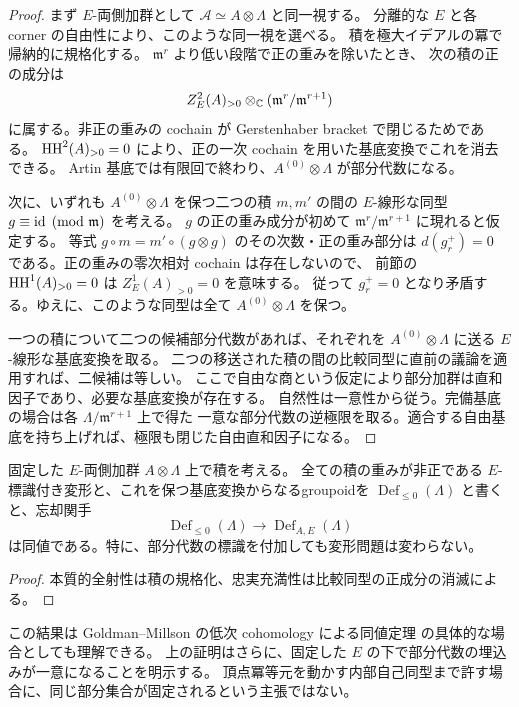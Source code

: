 \begin{proof}
まず $E$-両側加群として $\mathcal A\simeq A\otimes\Lambda$ と同一視する。
分離的な $E$ と各 corner の自由性により、このような同一視を選べる。
積を極大イデアルの冪で帰納的に規格化する。
$\mathfrak m^r$ より低い段階で正の重みを除いたとき、
次の積の正の成分は
\[
 Z^2_E(A)_{>0}\otimes_\mathbb C(\mathfrak m^r/\mathfrak m^{r+1})
\]
に属する。非正の重みの cochain が Gerstenhaber bracket で閉じるためである。
$\operatorname{HH}^2(A)_{>0}=0$ により、正の一次 cochain を用いた基底変換でこれを消去できる。
Artin 基底では有限回で終わり、$A^{(0)}\otimes\Lambda$ が部分代数になる。

次に、いずれも $A^{(0)}\otimes\Lambda$ を保つ二つの積 $m,m'$ の間の
$E$-線形な同型 $g\equiv\operatorname{id}\pmod{\mathfrak m}$ を考える。
$g$ の正の重み成分が初めて $\mathfrak m^r/\mathfrak m^{r+1}$ に現れると仮定する。
等式 $g\circ m=m'\circ(g\otimes g)$ のその次数・正の重み部分は
$d(g_r^+)=0$ である。正の重みの零次相対 cochain は存在しないので、
前節の $\operatorname{HH}^1(A)_{>0}=0$ は $Z^1_E(A)_{>0}=0$ を意味する。
従って $g_r^+=0$ となり矛盾する。ゆえに、このような同型は全て
$A^{(0)}\otimes\Lambda$ を保つ。

一つの積について二つの候補部分代数があれば、それぞれを
$A^{(0)}\otimes\Lambda$ に送る $E$-線形な基底変換を取る。
二つの移送された積の間の比較同型に直前の議論を適用すれば、二候補は等しい。
ここで自由な商という仮定により部分加群は直和因子であり、必要な基底変換が存在する。
自然性は一意性から従う。完備基底の場合は各 $\Lambda/\mathfrak m^{r+1}$ 上で得た
一意な部分代数の逆極限を取る。適合する自由基底を持ち上げれば、極限も閉じた自由直和因子になる。
\end{proof}

\begin{corollary}[変形groupoidの同値]
固定した $E$-両側加群 $A\otimes\Lambda$ 上で積を考える。
全ての積の重みが非正である $E$-標識付き変形と、これを保つ基底変換からなるgroupoidを
$\operatorname{Def}_{\le0}(\Lambda)$ と書くと、忘却関手
\[
 \operatorname{Def}_{\le0}(\Lambda)\longrightarrow\operatorname{Def}_{A,E}(\Lambda)
\]
は同値である。特に、部分代数の標識を付加しても変形問題は変わらない。
\end{corollary}
\begin{proof}
本質的全射性は積の規格化、忠実充満性は比較同型の正成分の消滅による。
\end{proof}

この結果は Goldman--Millson の低次 cohomology による同値定理
\cite{GoldmanMillson}の具体的な場合としても理解できる。
上の証明はさらに、固定した $E$ の下で部分代数の埋込みが一意になることを明示する。
頂点冪等元を動かす内部自己同型まで許す場合に、同じ部分集合が固定されるという主張ではない。

